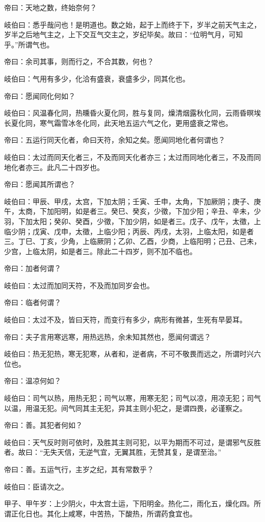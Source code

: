 \documentclass{article}%
\begin{document}
帝曰：天地之数，终始奈何？

岐伯曰：悉乎哉问也！是明道也。数之始，起于上而终于下，岁半之前天气主之，岁半之后地气主之，上下交互气交主之，岁纪毕矣。故曰：“位明气月，可知乎。”所谓气也。

帝曰：余司其事，则而行之，不合其数，何也？

岐伯曰：气用有多少，化洽有盛衰，衰盛多少，同其化也。

帝曰：愿闻同化何如？

岐伯曰：风温春化同，热曛昏火夏化同，胜与复同，燥清烟露秋化同，云雨昏暝埃长夏化同，寒气霜雪冰冬化同，此天地五运六气之化，更用盛衰之常也。

帝曰：五运行同天化者，命曰天符，余知之矣。愿闻同地化者何谓也？

岐伯曰：太过而同天化者三，不及而同天化者亦三；太过而同地化者三，不及而同地化者亦三。此凡二十四岁也。

帝曰：愿闻其所谓也？

岐伯曰：甲辰、甲戌，太宫，下加太阴；壬寅、壬申，太角，下加厥阴；庚子、庚午，太商，下加阳明，如是者三。癸巳、癸亥，少徵，下加少阳；辛丑、辛未，少羽，下加太阳；癸卯、癸酉，少徵，下加少阴，如是者三。戊子、戊午，太徵，上临少阴；戊寅、戊申，太徵，上临少阳；丙辰、丙戌，太羽，上临太阳，如是者三。丁巳、丁亥，少角，上临厥阴；乙卯、乙酉，少商，上临阳明；己丑、己未，少宫，上临太阴，如是者三。除此二十四岁，则不加不临也。

帝曰：加者何谓？

岐伯曰：太过而加同天符，不及而加同岁会也。

帝曰：临者何谓？

岐伯曰：太过不及，皆曰天符，而变行有多少，病形有微甚，生死有早晏耳。

帝曰：夫子言用寒远寒，用热远热，余未知其然也，愿闻何谓远？

岐伯曰：热无犯热，寒无犯寒，从者和，逆者病，不可不敬畏而远之，所谓时兴六位也。

帝曰：温凉何如？

岐伯曰：司气以热，用热无犯；司气以寒，用寒无犯；司气以凉，用凉无犯；司气以温，用温无犯。间气同其主无犯，异其主则小犯之，是谓四畏，必谨察之。

帝曰：善。其犯者何如？

岐伯曰：天气反时则可依时，及胜其主则可犯，以平为期而不可过，是谓邪气反胜者。故曰：“无失天信，无逆气宜，无翼其胜，无赞其复，是谓至治。”

帝曰：善。五运气行，主岁之纪，其有常数乎？

岐伯曰：臣请次之。

甲子、甲午岁：上少阴火，中太宫土运，下阳明金。热化二，雨化五，燥化四。所谓正化日也。其化上咸寒，中苦热，下酸热，所谓药食宜也。
\end{document}

